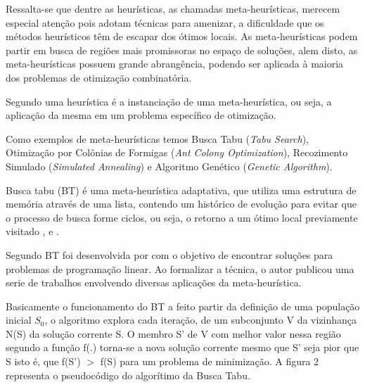 Ressalta-se que dentre as heurísticas, as chamadas meta-heurísticas, merecem especial atenção pois adotam técnicas para amenizar, a dificuldade que os métodos heurísticos têm de escapar dos ótimos locais. As meta-heurísticas podem partir em busca de regiões mais promissoras no espaço de soluções, alem disto, as meta-heurísticas possuem grande abrangência, podendo ser aplicada à maioria dos problemas de otimização combinatória.\cite{nascimento2005aplicaccao}\par

Segundo \cite{adrianocesar} uma heurística é a instanciação de uma meta-heurística, ou seja, a aplicação da mesma em um problema específico de otimização.\par

Como exemplos de meta-heurísticas temos Busca Tabu (\textit{Tabu Search}), Otimização por Colônias de Formigas (\textit{Ant Colony Optimization}), Recozimento Simulado (\textit{Simulated Annealing}) e Algoritmo Genético (\textit{Genetic Algorithm}).\par



Busca tabu (BT) é uma meta-heurística adaptativa, que utiliza uma estrutura de memória através de uma lista, contendo um histórico de evolução para evitar que o processo de busca forme ciclos, ou seja, o retorno a um ótimo local previamente visitado \cite{souza2000} , \cite{armentanointroduccao} e \cite{subramanian2006aplicaccao}.\par



Segundo \cite{subramanian2006aplicaccao} BT foi desenvolvida por \cite{glover1986future} com o objetivo de encontrar soluções para problemas de programação linear. Ao formalizar a técnica, o autor publicou uma serie de trabalhos envolvendo diversas aplicações da meta-heurística. \par


Basicamente o funcionamento do BT a feito partir da definição de uma população inicial ${S_0}$, o algoritmo explora cada iteração, de um subconjunto V da vizinhança N(S) da solução corrente S. O membro S’ de V com melhor valor nessa região segundo a função f(.) torna-se a nova solução corrente mesmo que S’ seja pior que S isto é, que f(S’) $>$ f(S) para um problema de minimização\cite{souza2000}. A figura 2 representa o pseudocódigo do algorítimo da Busca Tabu.

